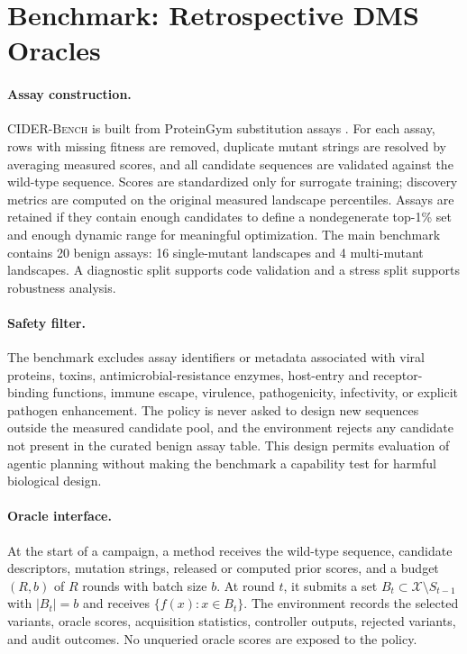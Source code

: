 \documentclass{article}
\newcommand{\bench}{\textsc{CIDER-Bench}}
\newcommand{\topone}{top-1\%}
\newcommand{\xset}{\mathcal X}
\begin{document}
\section{Benchmark: Retrospective DMS Oracles}
\label{sec:bench}

\paragraph{Assay construction.} \bench{} is built from ProteinGym substitution assays \citep{notin2023proteingym}. For each assay, rows with missing fitness are removed, duplicate mutant strings are resolved by averaging measured scores, and all candidate sequences are validated against the wild-type sequence. Scores are standardized only for surrogate training; discovery metrics are computed on the original measured landscape percentiles. Assays are retained if they contain enough candidates to define a nondegenerate \topone{} set and enough dynamic range for meaningful optimization. The main benchmark contains 20 benign assays: 16 single-mutant landscapes and 4 multi-mutant landscapes. A diagnostic split supports code validation and a stress split supports robustness analysis.

\paragraph{Safety filter.} The benchmark excludes assay identifiers or metadata associated with viral proteins, toxins, antimicrobial-resistance enzymes, host-entry and receptor-binding functions, immune escape, virulence, pathogenicity, infectivity, or explicit pathogen enhancement. The policy is never asked to design new sequences outside the measured candidate pool, and the environment rejects any candidate not present in the curated benign assay table. This design permits evaluation of agentic planning without making the benchmark a capability test for harmful biological design.

\paragraph{Oracle interface.} At the start of a campaign, a method receives the wild-type sequence, candidate descriptors, mutation strings, released or computed prior scores, and a budget $(R,b)$ of $R$ rounds with batch size $b$. At round $t$, it submits a set $B_t\subset \xset\setminus S_{t-1}$ with $|B_t|=b$ and receives $\{f(x):x\in B_t\}$. The environment records the selected variants, oracle scores, acquisition statistics, controller outputs, rejected variants, and audit outcomes. No unqueried oracle scores are exposed to the policy.
\end{document}
